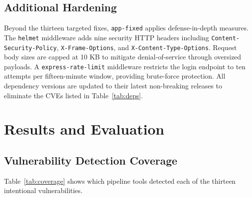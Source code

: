 \documentclass[10pt,conference]{IEEEtran}
\begin{document}
\subsection{Additional Hardening}

Beyond the thirteen targeted fixes, \texttt{app-fixed} applies defense-in-depth
measures.
The \texttt{helmet} middleware adds nine security HTTP headers including
\texttt{Content-Security-Policy}, \texttt{X-Frame-Options}, and
\texttt{X-Content-Type-Options}.
Request body sizes are capped at 10 KB to mitigate denial-of-service through
oversized payloads.
A \texttt{express-rate-limit} middleware restricts the login endpoint to ten
attempts per fifteen-minute window, providing brute-force protection.
All dependency versions are updated to their latest non-breaking releases to
eliminate the CVEs listed in Table~\ref{tab:deps}.

\section{Results and Evaluation}

\subsection{Vulnerability Detection Coverage}

Table~\ref{tab:coverage} shows which pipeline tools detected each of the
thirteen intentional vulnerabilities.
\end{document}
